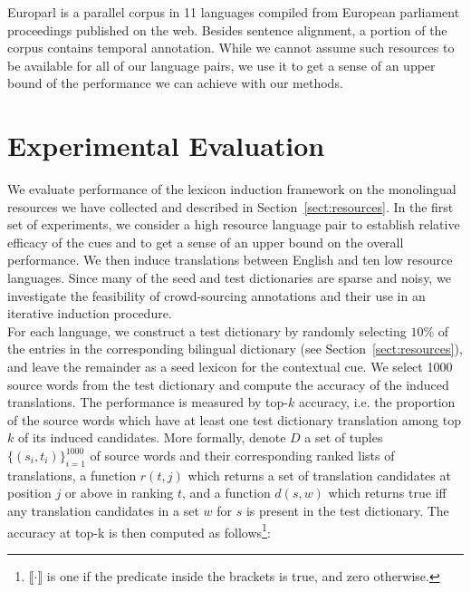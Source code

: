\documentclass{article}
\newcommand{\mnote}[1]{\marginpar{%
  \vskip-\baselineskip
  \raggedright\footnotesize
  \itshape\hrule\smallskip\tiny{#1}\par\smallskip\hrule}}
\newcommand{\mtodo}[1]{\mnote{\textcolor{red}{#1}}}
\newcommand{\secref}[1]{Section~\ref{#1}}
\begin{document}
\mtodo{Note: Ben's runs used an older crawl from April.}

  Europarl \cite{Koehn:2005} is a parallel corpus in 11 languages compiled from European parliament proceedings published on the web.  Besides sentence alignment, a portion of the corpus contains temporal annotation.  While we cannot assume such resources to be available for all of our language pairs, we use it to get a sense of an upper bound of the performance we can achieve with our methods.

\section{Experimental Evaluation} \label{sect:experiments}

We evaluate performance of the lexicon induction framework on the monolingual resources we have collected and described in \secref{sect:resources}.  In the first set of experiments, we consider a high resource language pair to establish relative efficacy of the cues and to get a sense of an upper bound on the overall performance. We then induce translations between English and ten low resource languages.  Since many of the seed and test dictionaries are sparse and noisy, we investigate the feasibility of crowd-sourcing annotations and their use in an iterative induction procedure. \\ %

For each language, we construct a test dictionary by randomly selecting $10\%$ of the entries in the corresponding bilingual dictionary (see \secref{sect:resources}), and leave the remainder as a seed lexicon for the contextual cue.  We select 1000 source words from the test dictionary and compute the accuracy of the induced translations.  The performance is measured by top-$k$ accuracy, i.e. the proportion of the source words which have at least one test dictionary translation among top $k$ of its induced candidates.  More formally, denote $D$ a set of tuples $\{(s_{i}, t_{i})\}_{i=1}^{1000}$ of source words and their corresponding ranked lists of translations, a function $r(t, j)$ which returns a set of translation candidates at position $j$ or above in ranking $t$, and a function $d(s, w)$ which returns true iff any translation candidates in a set $w$  for $s$ is present in the test dictionary.  The accuracy at top-k is then computed as follows\footnote{$\llbracket \cdot \rrbracket$ is one if the predicate inside the brackets is true, and zero otherwise.}:
\end{document}

